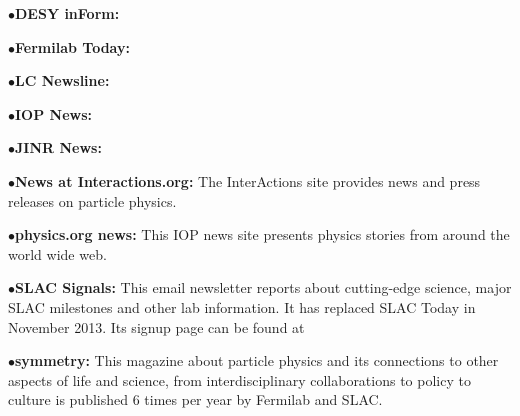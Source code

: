 \item{$\bullet$}{\bf DESY inForm:}
	\item{}
\medskip

\item{$\bullet$}{\bf Fermilab Today:}
	\item{}
\medskip

\item{$\bullet$}{\bf LC Newsline:}
	\item{}
	\item{}
\medskip

\item{$\bullet$}{\bf IOP News:}
     \item{}


\vfil\eject
\item{$\bullet$}{\bf JINR News:}
 \item{}

\medskip

\item{$\bullet$}{\bf News at Interactions.org:}
The InterActions site provides news and press releases on particle physics.
     \item{}
     \item{}

\medskip

\item{$\bullet$}{\bf physics.org news:}
This IOP news site presents physics stories from around the world wide web.
     \item{}


\item{$\bullet$}{\bf SLAC Signals:}
This email newsletter reports about cutting-edge science, major SLAC milestones and other lab information. It has replaced SLAC Today in November 2013. Its signup page can be found at 
	\item{}


\medskip

\item{$\bullet$}{\bf symmetry:}
This magazine about particle physics and its connections to other aspects of life and science, from interdisciplinary collaborations to policy to culture is published 6 times per year by Fermilab and SLAC.
     \item{}
     \item{}

